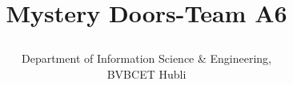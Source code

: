 \documentclass[11pt,a4,oneeside]{report}
\begin{document}
    \title{
    \textbf{\huge{Mystery Doors-Team A6}}
\author{Department of Information Science \& Engineering, \\ BVBCET Hubli}
}













%
%
\end{document}
